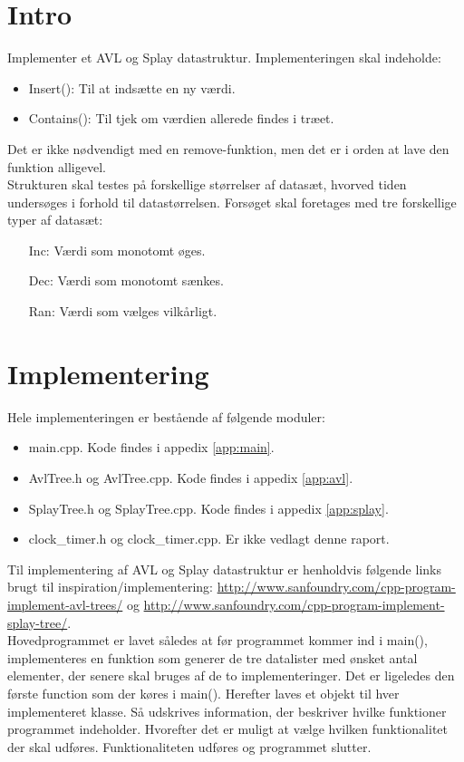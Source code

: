 \section{Intro}
\label{sec:intro}
Implementer et AVL og Splay datastruktur. Implementeringen skal indeholde:
\begin{itemize}
\item Insert(): Til at indsætte en ny værdi.
\item Contains(): Til tjek om værdien allerede findes i træet.
\end{itemize}
Det er ikke nødvendigt med en remove-funktion, men det er i orden at lave den funktion alligevel.\\
Strukturen skal testes på forskellige størrelser af datasæt, hvorved tiden undersøges i forhold til datastørrelsen. Forsøget skal foretages med tre forskellige typer af datasæt:
\begin{itemize}
\item [Inc:] Værdi som monotomt øges.
\item [Dec:] Værdi som monotomt sænkes.
\item [Ran:] Værdi som vælges vilkårligt.
\end{itemize}

\section{Implementering}
\label{sec:implementation}
Hele implementeringen er bestående af følgende moduler:
\begin{itemize}
\item main.cpp. Kode findes i appedix \ref{app:main}.
\item AvlTree.h og AvlTree.cpp. Kode findes i appedix \ref{app:avl}.
\item SplayTree.h og SplayTree.cpp. Kode findes i appedix \ref{app:splay}.
\item clock\_timer.h og clock\_timer.cpp. Er ikke vedlagt denne raport.
\end{itemize}

Til implementering af AVL og Splay datastruktur er henholdvis følgende links brugt til inspiration/implementering: \url{http://www.sanfoundry.com/cpp-program-implement-avl-trees/} og \url{http://www.sanfoundry.com/cpp-program-implement-splay-tree/}.\\
Hovedprogrammet er lavet således at før programmet kommer ind i main(), implementeres en funktion som generer de tre datalister med ønsket antal elementer, der senere skal bruges af de to implementeringer. Det er ligeledes den første function som der køres i main(). Herefter laves et objekt til hver implementeret klasse. Så udskrives information, der beskriver hvilke funktioner programmet indeholder. Hvorefter det er muligt at vælge hvilken funktionalitet der skal udføres. Funktionaliteten udføres og programmet slutter.

